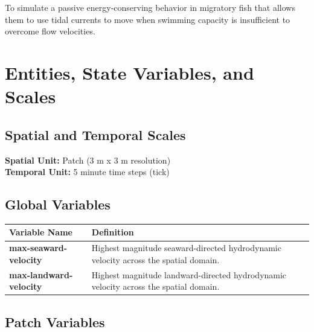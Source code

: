 \documentclass[
]{book}
\begin{document}
To simulate a passive energy-conserving behavior in migratory fish that allows them to use tidal currents to move when swimming capacity is insufficient to overcome flow velocities.

\section{Entities, State Variables, and Scales}\label{entities-state-variables-and-scales-10}

\subsection{Spatial and Temporal Scales}\label{spatial-and-temporal-scales-10}

\textbf{Spatial Unit:} Patch (3 m x 3 m resolution)\\
\textbf{Temporal Unit:} 5 minute time steps (tick)

\subsection{\texorpdfstring{\textbf{Global Variables}}{Global Variables}}\label{global-variables-9}

\begin{longtable}[]{@{}
  >{\raggedright\arraybackslash}p{}
  >{\raggedright\arraybackslash}p{}@{}}
\toprule\noalign{}
\begin{minipage}[b]{\linewidth}\raggedright
Variable Name
\end{minipage} & \begin{minipage}[b]{\linewidth}\raggedright
Definition
\end{minipage} \\
\midrule\noalign{}
\endhead
\bottomrule\noalign{}
\endlastfoot
\textbf{max-seaward-velocity} & Highest magnitude seaward-directed hydrodynamic velocity across the spatial domain. \\
\textbf{max-landward-velocity} & Highest magnitude landward-directed hydrodynamic velocity across the spatial domain. \\
\end{longtable}

\subsection{Patch Variables}\label{patch-variables-10}
\end{document}
